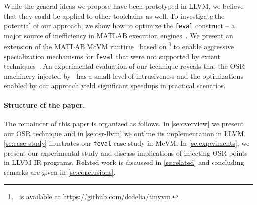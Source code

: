 
\noindent While the general ideas we propose have been prototyped in LLVM, we believe that they could be applied to other toolchains as well. To investigate the potential of our approach, we show how to optimize the {\tt feval} construct -- a major source of inefficiency in MATLAB execution engines~\cite{lameed2013feval, radpour2013refactoring}. We present an extension of the MATLAB McVM runtime~\cite{chevalier2010mcvm} based on \osrkit\footnote{\osrkit\ is available at \url{https://github.com/dcdelia/tinyvm}.} to enable aggressive specialization mechanisms for {\tt feval} that were not supported by extant techniques~\cite{lameed2013feval}. An experimental evaluation of our technique reveals that the OSR machinery injected by \osrkit\ has a small level of intrusiveness and the optimizations enabled by our approach yield significant speedups in practical scenarios.



\paragraph{Structure of the paper.}
The remainder of this paper is organized as follows. In \mysection\ref{se:overview} we present our OSR technique and in \mysection\ref{se:osr-llvm} we outline its implementation in LLVM. \mysection\ref{se:case-study} illustrates our {\tt feval} case study in McVM. In \mysection\ref{se:experiments}, we present our experimental study and discuss implications of injecting OSR points in LLVM IR programs. Related work is discussed in \mysection\ref{se:related} and concluding remarks are given in \mysection\ref{se:conclusions}. %
